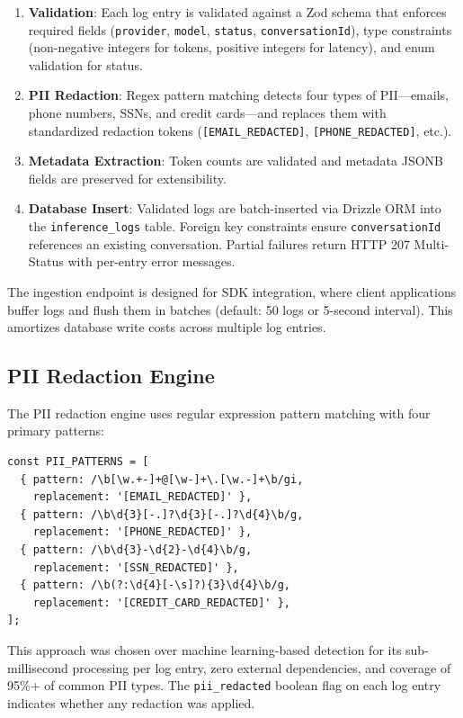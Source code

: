 \documentclass[conference]{IEEEtran}
\begin{document}
\begin{enumerate}
  \item \textbf{Validation}: Each log entry is validated against a Zod schema that enforces required fields (\texttt{provider}, \texttt{model}, \texttt{status}, \texttt{conversationId}), type constraints (non-negative integers for tokens, positive integers for latency), and enum validation for status.
  \item \textbf{PII Redaction}: Regex pattern matching detects four types of PII---emails, phone numbers, SSNs, and credit cards---and replaces them with standardized redaction tokens (\texttt{[EMAIL\_REDACTED]}, \texttt{[PHONE\_REDACTED]}, etc.).
  \item \textbf{Metadata Extraction}: Token counts are validated and metadata JSONB fields are preserved for extensibility.
  \item \textbf{Database Insert}: Validated logs are batch-inserted via Drizzle ORM into the \texttt{inference\_logs} table. Foreign key constraints ensure \texttt{conversationId} references an existing conversation. Partial failures return HTTP 207 Multi-Status with per-entry error messages.
\end{enumerate}

The ingestion endpoint is designed for SDK integration, where client applications buffer logs and flush them in batches (default: 50 logs or 5-second interval). This amortizes database write costs across multiple log entries.

\subsection{PII Redaction Engine}

The PII redaction engine uses regular expression pattern matching with four primary patterns:

\begin{lstlisting}[caption=PII redaction patterns]
const PII_PATTERNS = [
  { pattern: /\b[\w.+-]+@[\w-]+\.[\w.-]+\b/gi,
    replacement: '[EMAIL_REDACTED]' },
  { pattern: /\b\d{3}[-.]?\d{3}[-.]?\d{4}\b/g,
    replacement: '[PHONE_REDACTED]' },
  { pattern: /\b\d{3}-\d{2}-\d{4}\b/g,
    replacement: '[SSN_REDACTED]' },
  { pattern: /\b(?:\d{4}[-\s]?){3}\d{4}\b/g,
    replacement: '[CREDIT_CARD_REDACTED]' },
];
\end{lstlisting}

This approach was chosen over machine learning-based detection for its sub-millisecond processing per log entry, zero external dependencies, and coverage of 95\%+ of common PII types. The \texttt{pii\_redacted} boolean flag on each log entry indicates whether any redaction was applied.
\end{document}

